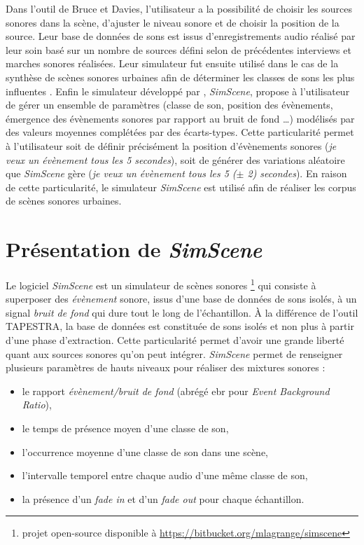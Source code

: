 Dans l'outil de Bruce et Davies, l'utilisateur a la possibilité de choisir les sources sonores dans la scène, d'ajuster le niveau sonore et de choisir la position de la source. Leur base de données de sons est issus d'enregistrements audio réalisé par leur soin basé sur un nombre de sources défini selon de précédentes interviews et marches sonores réalisées. Leur simulateur fut ensuite utilisé dans le cas de la synthèse de scènes sonores urbaines afin de déterminer les classes de sons les plus influentes \cite{davies2014soundscape}.
Enfin le simulateur développé par \cite{rossignol_simscene_2015}, \textit{SimScene}, propose à l'utilisateur de gérer un ensemble de paramètres (classe de son, position des évènements, émergence des évènements sonores par rapport au bruit de fond \dots) modélisés par des valeurs moyennes complétées par des écarts-types.
Cette particularité permet à l'utilisateur soit de définir précisément la position d'évènements sonores (\textit{je veux un évènement tous les 5 secondes}), soit de générer des variations aléatoire que \textit{SimScene} gère (\textit{je veux un évènement tous les 5 ($\pm$ 2) secondes}). En raison de cette particularité, le simulateur \textit{SimScene} est utilisé afin de réaliser les corpus de scènes sonores urbaines.

\section{Présentation de \textit{SimScene}}
Le logiciel \textit{SimScene} \cite{rossignol_simscene_2015} est un simulateur de scènes sonores \footnote{projet open-source disponible à \url{https://bitbucket.org/mlagrange/simscene}} qui consiste à superposer des \textit{évènement} sonore, issus d'une base de données de sons isolés, à un signal \textit{bruit de fond} qui dure tout le long de l'échantillon. À la différence de l'outil TAPESTRA, la base de données est constituée de sons isolés et non plus à partir d'une phase d'extraction. Cette particularité permet d'avoir une grande liberté quant aux sources sonores qu'on peut intégrer. \textit{SimScene} permet de renseigner plusieurs paramètres de hauts niveaux pour réaliser des mixtures sonores :

\begin{itemize}
\item le rapport \textit{évènement/bruit de fond} (abrégé ebr pour \textit{Event Background Ratio}),
\item le temps de présence moyen d'une classe de son,
\item l'occurrence moyenne d'une classe de son dans une scène,
\item l'intervalle temporel entre chaque audio d'une même classe de son,
\item la présence d'un \textit{fade in} et d'un \textit{fade out} pour chaque échantillon.\\
\end{itemize}

